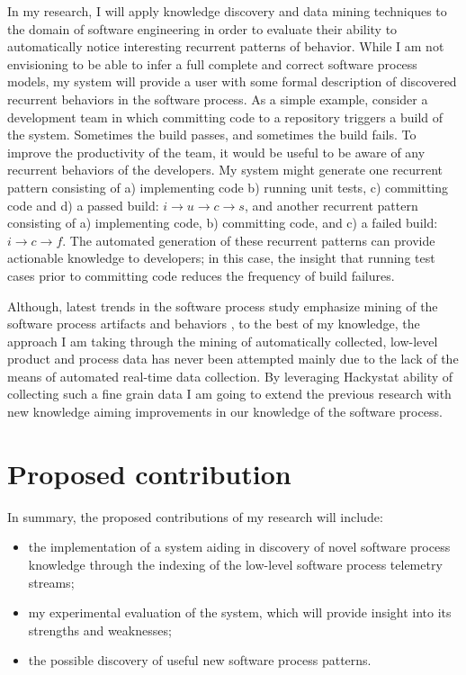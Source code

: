 In my research, I will apply knowledge discovery and data mining techniques to the domain of software engineering in order to evaluate their ability to automatically notice interesting recurrent patterns of behavior. While I am not envisioning to be able to infer a full complete and correct software process models, my system will provide a user with some formal description of discovered recurrent behaviors in the software process. As a simple example, consider a development team in which committing code to a repository triggers a build of the system. Sometimes the build passes, and sometimes the build fails. To improve the productivity of the team, it would be useful to be aware of any recurrent behaviors of the developers. My system might generate one recurrent pattern consisting of a) implementing code b) running unit tests, c) committing code and d) a passed build: $i \rightarrow u \rightarrow c \rightarrow s $, and another recurrent pattern consisting of a) implementing code, b) committing code, and c) a failed build: $i \rightarrow c \rightarrow f $. The automated generation of these recurrent patterns can provide actionable knowledge to developers; in this case, the insight that running test cases prior to committing code reduces the frequency of build failures.

Although, latest trends in the software process study emphasize mining of the software process artifacts and behaviors \cite{citeulike:5043664} \cite{citeulike:1885717} \cite{citeulike:5112229} \cite{citeulike:1885717}, to the best of my knowledge, the approach I am taking through the mining of automatically collected, low-level product and process data has never been attempted mainly due to the lack of the means of automated real-time data collection. By leveraging Hackystat ability of collecting such a fine grain data I am going to extend the previous research with new knowledge aiming improvements in our knowledge of the software process.

\section{Proposed contribution}
In summary, the proposed contributions of my research will include: 
\begin{itemize}
	\item the implementation of a system aiding in discovery of novel software process knowledge through the indexing of the low-level software process telemetry streams;
	\item my experimental evaluation of the system, which will provide insight into its strengths and weaknesses;
	\item the possible discovery of useful new software process patterns.
\end{itemize}


